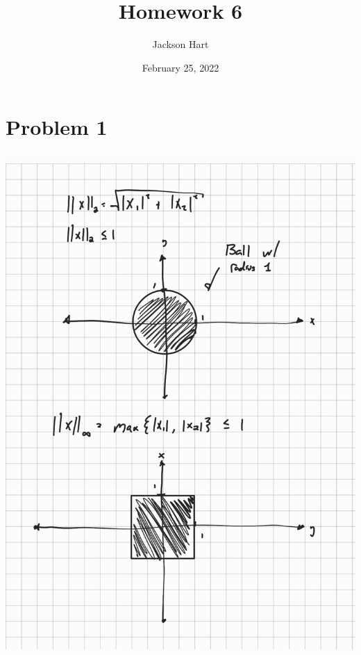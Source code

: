 \documentclass{article}
\title{Homework 6}
\author{Jackson Hart}
\date{February 25, 2022}
\begin{document}
\maketitle
\section*{Problem 1}
\includegraphics[scale=0.25]{Temp}
\end{document}
